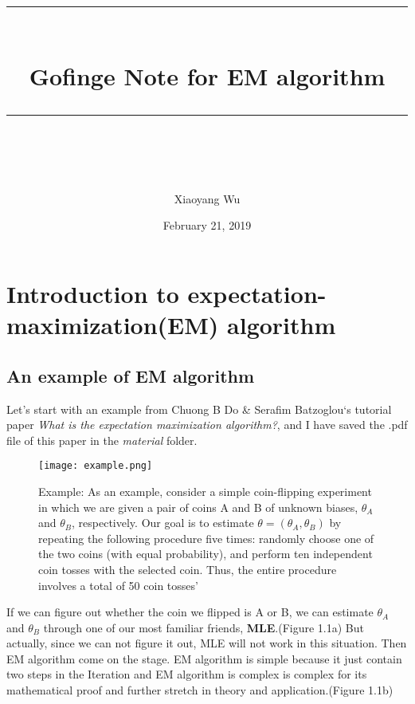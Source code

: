 \documentclass[11pt]{scrartcl} %
\title{	
	\normalfont\normalsize
	\rule{\linewidth}{0.5pt}\\ %
	\vspace{20pt} %
	{\huge Gofinge Note for EM algorithm}\\ %
	\vspace{12pt} %
	\rule{\linewidth}{2pt}\\ %
	\vspace{12pt} %
}
\author{\LARGE Xiaoyang Wu} %
\date{\normalsize February 21, 2019} %
\begin{document}
\maketitle %


\section{Introduction to expectation-maximization(EM)  algorithm}

\subsection{An example of EM algorithm}

Let's start with an example from Chuong B Do \& Serafim Batzoglou‘s tutorial paper \textit{What is the expectation maximization algorithm?}, and I have saved the .pdf file of this paper in the \textit{material} folder.

\medskip

\begin{figure}[h] %
	\centering
	\texttt{[image: example.png]} %
	\caption{Example: As an example, consider a simple coin-flipping experiment in which we are given a pair of coins A and B of unknown biases, $\theta_A$ and $\theta_B$, respectively. Our goal is to estimate $\theta = (\theta_A, \theta_B)$ by repeating the following procedure five times: randomly choose one of the two coins (with equal probability), and perform ten independent coin tosses with the selected coin. Thus, the entire procedure involves a total of 50 coin tosses'}
\end{figure}

If we can figure out whether the coin we flipped is A or B, we can estimate $\theta_A$ and $\theta_B$ through one of our most familiar friends, \textbf{MLE}.(Figure 1.1a) But actually, since we can not figure it out, MLE will not work in this situation. Then EM algorithm come on the stage. EM algorithm is simple because it just contain two steps in the Iteration and EM algorithm is complex is complex for its mathematical proof and further stretch in theory and application.(Figure 1.1b)
\end{document}

